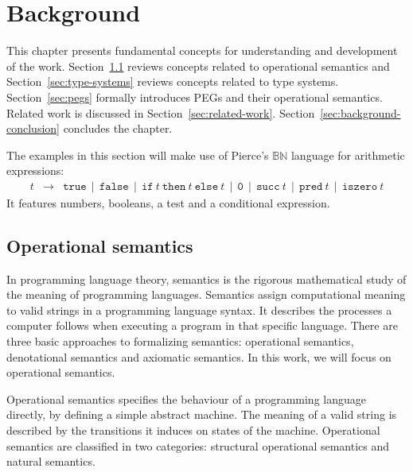 \chapter{Background}\label{chap:background}

This chapter presents fundamental concepts for understanding and development of the
work. Section~\ref{sec:operational-semantics} reviews concepts related to operational
semantics and Section~\ref{sec:type-systems} reviews concepts related to type systems.
Section~\ref{sec:pegs} formally introduces PEGs and their operational semantics.
Related work is discussed in Section~\ref{sec:related-work}.
Section~\ref{sec:background-conclusion} concludes the chapter.

The examples in this section will make use of Pierce's
\cite{pierce2002-types-and-programming-languages}
\(\mathbb{B}\mathbb{N}\) language for arithmetic expressions:
\[
    \begin{array}{lcl}
        t & \to & \texttt{true} \, \mid \, \texttt{false} \,
                \mid \, \texttt{if} \: t \: \texttt{then} \: t \: \texttt{else} \: t \,
                \mid \, \texttt{0} \, \mid \, \texttt{succ} \: t \,
                \mid \, \texttt{pred} \: t \, \mid \, \texttt{iszero} \: t
    \end{array}
\]
It features numbers, booleans, a test and a conditional expression.

\section{Operational semantics}\label{sec:operational-semantics}

In programming language theory, semantics is the rigorous mathematical study of
the meaning of programming languages. Semantics assign computational meaning to
valid strings in a programming language syntax. It describes the processes a
computer follows when executing a program in that specific language. There are
three basic approaches to formalizing semantics: operational semantics, denotational
semantics and axiomatic semantics.
In this work, we will focus on operational semantics.

Operational semantics specifies the behaviour of a programming language directly,
by defining a simple abstract machine. The meaning of a valid string is described
by the transitions it induces on states of the machine. Operational semantics
are classified in two categories: structural operational semantics and natural
semantics.

